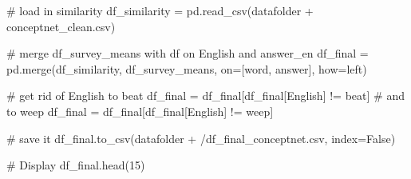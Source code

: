 \documentclass[
  letterpaper,
  DIV=11,
  numbers=noendperiod]{scrreprt}
\newenvironment{Shaded}{\begin{snugshade}}{\end{snugshade}}
\newcommand{\CommentTok}[1]{\textcolor[rgb]{0.37,0.37,0.37}{#1}}
\newcommand{\DecValTok}[1]{\textcolor[rgb]{0.68,0.00,0.00}{#1}}
\newcommand{\NormalTok}[1]{\textcolor[rgb]{0.00,0.23,0.31}{#1}}
\newcommand{\OperatorTok}[1]{\textcolor[rgb]{0.37,0.37,0.37}{#1}}
\newcommand{\StringTok}[1]{\textcolor[rgb]{0.13,0.47,0.30}{#1}}
\newcommand{\VariableTok}[1]{\textcolor[rgb]{0.07,0.07,0.07}{#1}}
\begin{document}
\begin{Shaded}
\begin{Highlighting}[]
\CommentTok{\# load in similarity}
\NormalTok{df\_similarity }\OperatorTok{=}\NormalTok{ pd.read\_csv(datafolder }\OperatorTok{+} \StringTok{\textquotesingle{}conceptnet\_clean.csv\textquotesingle{}}\NormalTok{)}

\CommentTok{\# merge df\_survey\_means with df on English and answer\_en}
\NormalTok{df\_final }\OperatorTok{=}\NormalTok{ pd.merge(df\_similarity, df\_survey\_means, on}\OperatorTok{=}\NormalTok{[}\StringTok{\textquotesingle{}word\textquotesingle{}}\NormalTok{, }\StringTok{\textquotesingle{}answer\textquotesingle{}}\NormalTok{], how}\OperatorTok{=}\StringTok{\textquotesingle{}left\textquotesingle{}}\NormalTok{)}

\CommentTok{\# get rid of English \textquotesingle{}to beat\textquotesingle{}}
\NormalTok{df\_final }\OperatorTok{=}\NormalTok{ df\_final[df\_final[}\StringTok{\textquotesingle{}English\textquotesingle{}}\NormalTok{] }\OperatorTok{!=} \StringTok{\textquotesingle{}beat\textquotesingle{}}\NormalTok{]}
\CommentTok{\# and to weep}
\NormalTok{df\_final }\OperatorTok{=}\NormalTok{ df\_final[df\_final[}\StringTok{\textquotesingle{}English\textquotesingle{}}\NormalTok{] }\OperatorTok{!=} \StringTok{\textquotesingle{}weep\textquotesingle{}}\NormalTok{]}

\CommentTok{\# save it}
\NormalTok{df\_final.to\_csv(datafolder }\OperatorTok{+} \StringTok{\textquotesingle{}/df\_final\_conceptnet.csv\textquotesingle{}}\NormalTok{, index}\OperatorTok{=}\VariableTok{False}\NormalTok{)}

\CommentTok{\# Display}
\NormalTok{df\_final.head(}\DecValTok{15}\NormalTok{)}
\end{Highlighting}
\end{Shaded}
\end{document}
